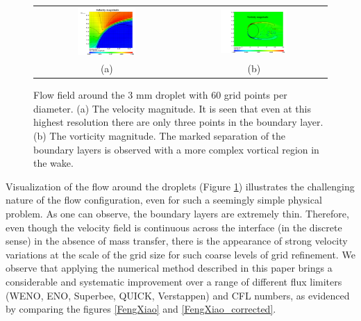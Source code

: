 \begin{figure}[!h]
\begin{center}
\begin{tabular}{cc}
\includegraphics[width=0.42\textwidth]{Figures/vel.png}
& \includegraphics[width=0.48\textwidth]{Figures/vort.png} \\
(a) & (b)
\end{tabular}
\end{center}
\caption{Flow field around the 3 mm droplet with 60 grid points per diameter. 
(a) The velocity magnitude. It is seen that even at this highest resolution 
there are only three points in the boundary layer. (b) The vorticity magnitude. 
The marked separation of the boundary layers is observed with 
a more complex vortical region in the wake.}
\label{magn}
\end{figure}
\newcommand\DDD{{\cal D}}

Visualization of the flow around the droplets (Figure \ref{magn}) illustrates the challenging nature of the flow configuration, even for such a seemingly simple physical problem. As one can observe, the boundary layers are extremely thin. Therefore, even though the velocity field is continuous across the interface (in the discrete sense) in the absence of mass transfer, there is the appearance of strong velocity variations at the scale of the grid size for such coarse levels of grid refinement. We observe that applying the numerical method described in this paper brings a considerable and systematic improvement over a range of different flux limiters (WENO, ENO, Superbee, QUICK, Verstappen) and CFL numbers, as evidenced by comparing the figures \ref{FengXiao} and \ref{FengXiao_corrected}. 

